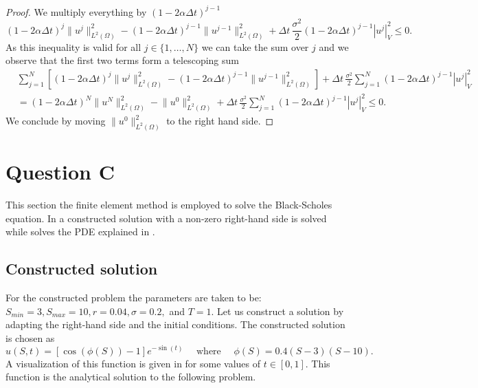 \documentclass{article}
\newcommand{\sigmafrac}{\ensuremath{\frac{\sigma^2}{2}}}
\newcommand{\seminormsq}[1]{\ensuremath{|#1|_V^2}}
\newcommand{\normsq}[1]{\ensuremath{\|#1\|_{L^2(\Omega)}^2}}
\begin{document}
\begin{proof}
   We multiply everything by $(1- 2\alpha \Delta t)^{j-1}$
   \begin{equation*}
       (1- 2\alpha \Delta t)^{j}\normsq{u^{j}}  - (1- 2\alpha \Delta t)^{j-1} \normsq{u^{j-1}} + \Delta t \, \sigmafrac (1- 2\alpha \Delta t)^{j-1}\seminormsq{u^{j}} \leq 0.
   \end{equation*}
   As this inequality is valid for all $j \in \{1, \ldots, N \}$ we can take the sum over $j$ and we observe that the first two terms form a telescoping sum
   \begin{align*}
       &\sum_{j=1}^{N} \left[(1- 2\alpha \Delta t)^{j}\normsq{u^{j}}  - (1- 2\alpha \Delta t)^{j-1} \normsq{u^{j-1}}\right] + \Delta t \, \sigmafrac \sum_{j=1}^{N}(1- 2\alpha \Delta t)^{j-1}\seminormsq{u^{j}} \\
       &= (1- 2\alpha \Delta t)^{N}\normsq{u^{N}} - \normsq{u^{0}} + \Delta t \, \sigmafrac \sum_{j=1}^{N}(1- 2\alpha \Delta t)^{j-1}\seminormsq{u^{j}} \leq 0.
   \end{align*}
   We conclude by moving $\normsq{u^{0}}$ to the right hand side.\qedhere
\end{proof}



\section{Question C}
This section the finite element method is employed to solve the Black-Scholes equation. In  a constructed solution with a non-zero right-hand side is solved while  solves the PDE explained in . 
\subsection{Constructed solution}\label{sec:constructed_cos}
For the constructed problem the parameters are taken to be: $S_{min} = 3, S_{max}=10, r=0.04, \sigma = 0.2,$ and $T=1$. Let us construct a solution by adapting the right-hand side and the initial conditions. The constructed solution is chosen as
\begin{equation}\label{eq:constructed_cos}
    u(S,t)=\left[\cos\left(\phi(S)\right)-1\right]e^{-\sin(t)} \quad \text{ where } \quad \phi(S)=0.4(S-3)(S-10).
\end{equation}
A visualization of this function is given in  for some values of $t \in [0,1]$. This function is the analytical solution to the following problem.
\end{document}
